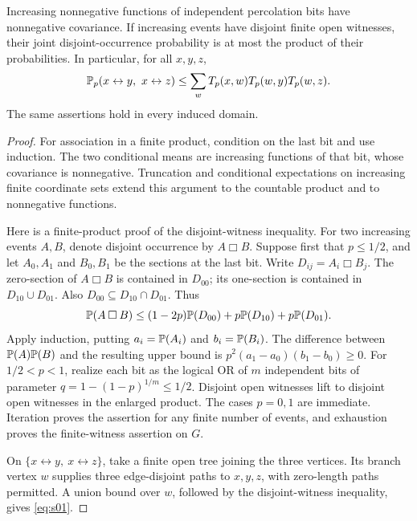 \begin{lemma}
\label{pre:probability-tools}
Increasing nonnegative functions of independent percolation bits have
nonnegative covariance. If increasing events have disjoint finite open
witnesses, their joint disjoint-occurrence probability is at most the
product of their probabilities. In particular, for all $x,y,z$,
\begin{equation}\label{eq:s01}
 \mathbb P_p(x\leftrightarrow y,\ x\leftrightarrow z)
 \le\sum_w T_p(x,w)T_p(w,y)T_p(w,z).
\end{equation}
The same assertions hold in every induced domain.
\end{lemma}
\begin{proof}
For association in a finite product, condition on the last bit and use
induction. The two conditional means are increasing functions of that
bit, whose covariance is nonnegative. Truncation and conditional
expectations on increasing finite coordinate sets extend this argument
to the countable product and to nonnegative functions.

Here is a finite-product proof of the disjoint-witness inequality.
For two increasing events $A,B$, denote disjoint occurrence by
$A\mathbin{\Box}B$. Suppose first that $p\le1/2$, and let $A_0,A_1$
and $B_0,B_1$ be the sections at the last bit. Write
$D_{ij}=A_i\mathbin{\Box}B_j$. The zero-section of
$A\mathbin{\Box}B$ is contained in $D_{00}$; its one-section is
contained in $D_{10}\cup D_{01}$. Also
$D_{00}\subseteq D_{10}\cap D_{01}$. Thus
\[
 \mathbb P(A\mathbin{\Box}B)
 \le(1-2p)\mathbb P(D_{00})+p\mathbb P(D_{10})+p\mathbb P(D_{01}).
\]
Apply induction, putting $a_i=\mathbb P(A_i)$ and $b_i=\mathbb P(B_i)$.
The difference between $\mathbb P(A)\mathbb P(B)$ and the resulting upper
bound is $p^2(a_1-a_0)(b_1-b_0)\ge0$.
For $1/2<p<1$, realize each bit as the logical OR of $m$ independent
bits of parameter $q=1-(1-p)^{1/m}\le1/2$. Disjoint open witnesses
lift to disjoint open witnesses in the enlarged product. The cases
$p=0,1$ are immediate. Iteration proves the assertion for any finite
number of events, and exhaustion proves the finite-witness assertion
on $G$.

On $\{x\leftrightarrow y,\ x\leftrightarrow z\}$, take a finite open
tree joining the three vertices. Its branch vertex $w$ supplies three
edge-disjoint paths to $x,y,z$, with zero-length paths permitted.
A union bound over $w$, followed by the disjoint-witness inequality,
gives \eqref{eq:s01}.
\end{proof}

